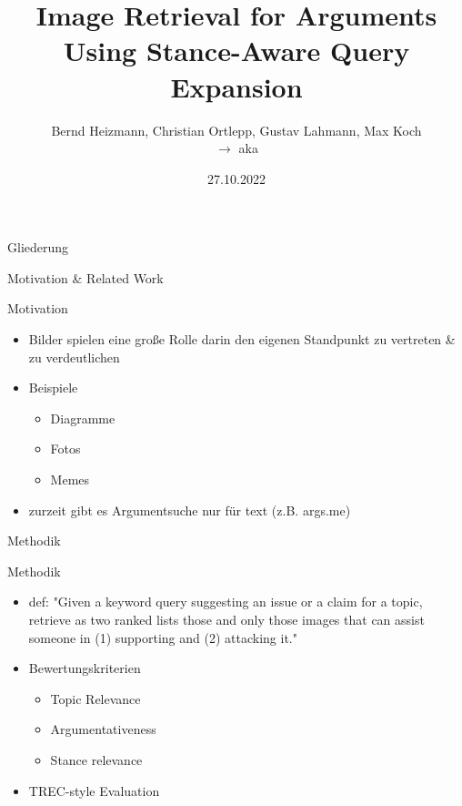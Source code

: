 \documentclass{beamer}
\title{Image Retrieval for Arguments Using Stance-Aware Query Expansion \cite{kiesel:2021e}}
\author{Bernd Heizmann, Christian Ortlepp, Gustav Lahmann, Max Koch\\$\longrightarrow$ aka \teamname}
\institute{Friedrich-Schiller-Universität Jena}
\date{27.10.2022}
\begin{document}
	
	\maketitle
	\begin{frame}{Gliederung}
		\tableofcontents
	\end{frame}
	
	\begin{section}{Motivation \& Related Work} %
		\begin{frame}{Motivation}
			\begin{itemize}
				\item Bilder spielen eine große Rolle darin den eigenen Standpunkt zu vertreten \& zu verdeutlichen
				\item Beispiele \begin{itemize}
					\item Diagramme
					\item Fotos
					\item Memes
				\end{itemize}
			\item zurzeit gibt es Argumentsuche nur für text (z.B. args.me)
			\end{itemize}
		\end{frame}
	\end{section}
	
	\begin{section}{Methodik}
		\begin{frame}{Methodik}
			\begin{itemize}
				\item def: "Given a keyword query suggesting an issue or a claim for a topic, retrieve as two ranked lists those and only those images that can assist someone in (1) supporting and (2) attacking it."
				\item Bewertungskriterien \begin{itemize}
					\item Topic Relevance
					\item Argumentativeness
					\item Stance relevance
				\end{itemize}
				\item TREC-style Evaluation
			\end{itemize}
		\end{frame}
	
	\end{section}
\end{document}
